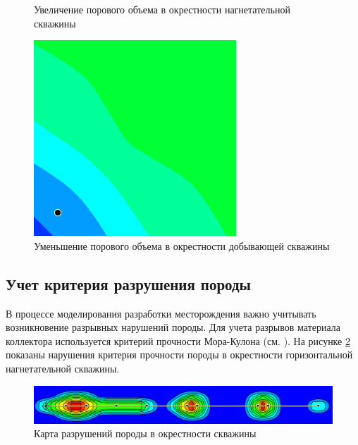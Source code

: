 \documentclass[11pt,twoside]{article}
\begin{document}
\begin{figure}[h!]
\begin{minipage}{0.3\linewidth}
\caption{Увеличение порового объема в окрестности нагнетательной скважины}
\label{pore_volume_injection}
\end{minipage}
\hfill
\begin{minipage}{0.3\linewidth}
\includegraphics[width=1\linewidth]{production.png}
\caption{Уменьшение порового объема в окрестности добывающей скважины}
\label{pore_volume_production}
\end{minipage}
\end{figure}

\subsection{Учет критерия разрушения породы}
В процессе моделирования разработки месторождения важно учитывать возникновение разрывных нарушений породы. Для учета разрывов материала коллектора используется критерий прочности Мора-Кулона (см. \cite{Belousov}). На рисунке \ref{rock_destruction} показаны нарушения критерия прочности породы в окрестности горизонтальной нагнетательной скважины.

{
\begin{figure}[h!]
\includegraphics[width=1\linewidth]{rock_destruction.png}
\caption{Карта разрушений породы в окрестности скважины}
\label{rock_destruction}
\end{figure}
}
\end{document}
